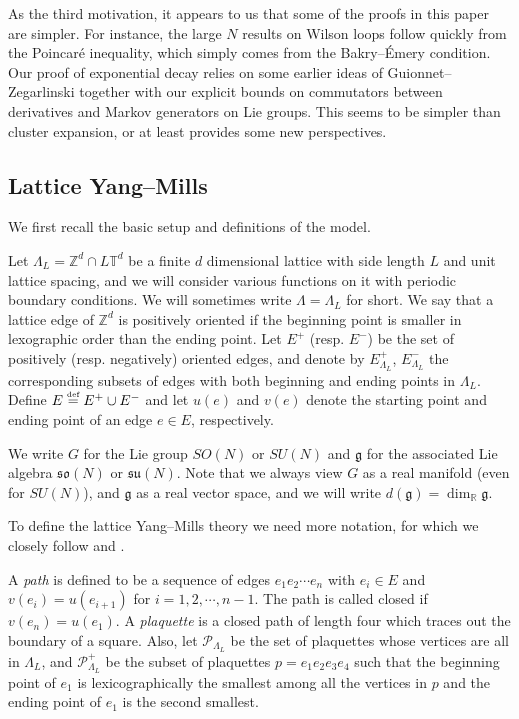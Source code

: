 \documentclass[11pt,UTF-8,reqno]{amsart}
\numberwithin{equation}{section}
\newcommand{\eqdef}{\stackrel{\mbox{\tiny def}}{=}}
\def\mT{{\mathbb T}}
\def\mZ{{\mathbb Z}}
\def\CP{\mathcal{P}}
\def\so{\mathfrak{so}}
\def\su{\mathfrak{su}}
\def\mfg{\mathfrak{g}}
\def\dg{d(\mfg)}
\def\R{\mathbb R}
\begin{document}
As the third motivation, it appears to us that 
some of the proofs in this paper are simpler.
For instance, the large $N$  results on Wilson loops
follow quickly from the Poincar\'e inequality,
which simply comes from the Bakry--\'Emery condition.
Our proof of exponential decay relies on 
some earlier ideas of  Guionnet--Zegarlinski \cite{GZ}
together with our explicit bounds on 
commutators between derivatives and Markov generators 
on Lie groups. This seems to be simpler than cluster expansion,
or at least provides some new perspectives.




\subsection{Lattice Yang--Mills}
\label{sec:YM}


We first recall the basic setup and definitions of the model.

Let $\Lambda_{L}=\mZ^d\cap L\mT^d$ be a finite $d$ dimensional lattice
with side length $L$ and unit lattice spacing, and we will consider various functions on it with periodic boundary conditions.
We will sometimes write $\Lambda=\Lambda_{L}$ for short.
We say that a lattice edge of $\mZ^d$ is positively oriented if the beginning point is smaller in lexographic order than the ending point.
Let $E^+$ (resp. $E^-$) be the set of positively (resp. negatively) oriented edges,
and  denote by $E_{\Lambda_{L}}^+$, $E_{\Lambda_{L}}^-$ the corresponding subsets
of edges with both beginning and ending points in ${\Lambda_{L}}$.  Define $E\eqdef E^+\cup E^-$ and let $u(e)$ and $v(e)$ denote the starting point and ending point of an edge $e\in E$, respectively.


We write  $G$ for the Lie group
$SO(N)$ or $SU(N)$ and $\mfg$ for the associated Lie algebra $\so(N)$ or $\su(N)$.
Note that we always view $G$ as a real manifold (even for $SU(N)$), and $\mfg$ as a real vector space, and we will write
$\dg = \dim_{\R} \mfg $.

To define the lattice Yang--Mills theory we need more notation,
for which we closely follow \cite{Cha} and \cite{SSZloop}.


A {\it path}  is defined to be a sequence of edges $e_1e_2\cdots e_n$ with $e_i\in E$ and $v(e_i)=u(e_{i+1})$ for $i=1,2,\cdots, n-1$. The path is called closed if $v(e_n)=u(e_1)$.
A {\it plaquette} is a closed path of length four which traces out the boundary of a square.
Also, let $\CP_{\Lambda_{L}}$ be the set of plaquettes whose vertices are all in $\Lambda_{L}$, and
$\CP^+_{\Lambda_{L}}$ be the subset of plaquettes $p=e_1e_2e_3e_4$ such that
the beginning point of $e_1$ is lexicographically the smallest among all the vertices in $p$ and the ending point of $e_1$ is the second smallest.
\end{document}
